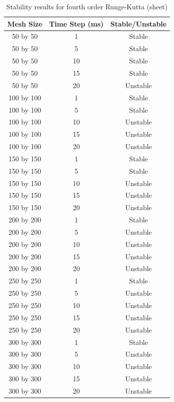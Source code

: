 \begin{table}[tp]
   \begin{minipage}{\textwidth}
      \begin{center}
         \begin{tabular}{c|c|c}
           Mesh Size & Time Step (ms) & Stable/Unstable\\
           \hline
           50 by 50 & 1 & Stable\\
           50 by 50 & 5 & Stable\\
           50 by 50 & 10 & Stable\\
           50 by 50 & 15 & Stable\\
           50 by 50 & 20 & Unstable\\
           100 by 100 & 1 & Stable\\
           100 by 100 & 5 & Stable\\
           100 by 100 & 10 & Unstable\\
           100 by 100 & 15 & Unstable\\
           100 by 100 & 20 & Unstable\\           
           150 by 150 & 1 & Stable\\
           150 by 150 & 5 & Stable\\
           150 by 150 & 10 & Unstable\\
           150 by 150 & 15 & Unstable\\
           150 by 150 & 20 & Unstable\\           
           200 by 200 & 1 & Stable\\
           200 by 200 & 5 & Unstable\\
           200 by 200 & 10 & Unstable\\
           200 by 200 & 15 & Unstable\\
           200 by 200 & 20 & Unstable\\           
           250 by 250 & 1 & Stable\\
           250 by 250 & 5 & Unstable\\
           250 by 250 & 10 & Unstable\\
           250 by 250 & 15 & Unstable\\
           250 by 250 & 20 & Unstable\\           
           300 by 300 & 1 & Stable\\
           300 by 300 & 5 & Unstable\\
           300 by 300 & 10 & Unstable\\
           300 by 300 & 15 & Unstable\\
           300 by 300 & 20 & Unstable\\
         \end{tabular}
      \end{center}
   \end{minipage}
   \caption{Stability results for fourth order Runge-Kutta (sheet)}
   \label{tab:rk4 stability sheet}
\end{table}

